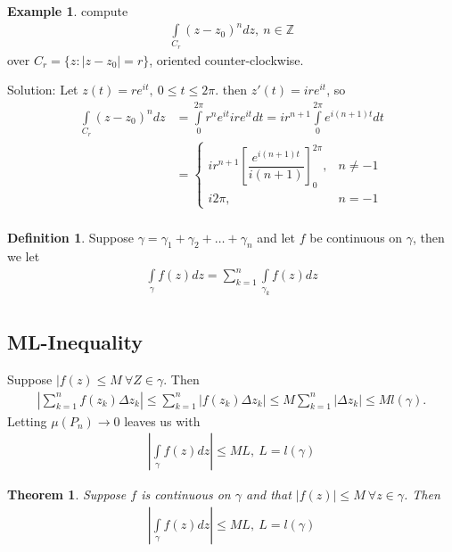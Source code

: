\documentclass[12pt, a4paper]{article}
\theoremstyle{plain}
\newtheorem{thm}{Theorem} %
\theoremstyle{definition}
\newtheorem{definition}{Definition} %
\newtheorem{example}{Example} %
\begin{document}
			\begin{example}
				compute
				\begin{align*}
					\int\limits_{C_r}(z-z_0)^ndz, \:n\in \mathbb{Z}
				\end{align*}
				over $C_r=\{z:|z-z_0|=r\}$, oriented counter-clockwise.

				Solution: Let $z(t)=re^{it},\:0\le t\le 2\pi$. then $z'(t)=ire^{it}$, so
				\begin{align*}
					\int\limits_{C_r}(z-z_0)^ndz &= 
					\int\limits_{0}^{2\pi}r^ne^{it}ire^{it}dt =
					ir^{n+1}\int\limits_{0}^{2\pi}e^{i(n+1)t}dt\\ &=
					\begin{cases}
						ir^{n+1}\left[\dfrac{e^{i(n+1)t}}{i(n+1)}\right]_0^{2\pi}, &n\not=-1\\[0.3cm]
						i2\pi, &n=-1
					\end{cases}\\
				\end{align*}

				\begin{definition}
					Suppose $\gamma=\gamma_1+\gamma_2+\ldots+\gamma_n$ and let $f$ be continuous on $\gamma$, then we let
					\begin{align*}
						\int\limits_{\gamma}f(z)dz = \sum\limits_{k=1}^{n}\int\limits_{\gamma_k}f(z)dz\tag*{and if $\gamma=z_0$ the integral vanishes identically.}\\
					\end{align*}
				\end{definition}
			\end{example}

		\subsection{ML-Inequality} %
		\label{sub:ml_inequality}
			Suppose $|f(z)\le M\:\forall Z\in \gamma$. Then
			\begin{align*}
				\left|\sum\limits_{k=1}^{n}f(z_k)\Delta z_k\right| \le
				\sum\limits_{k=1}^{n}\left|f(z_k)\Delta z_k\right| \le
				M\sum\limits_{k=1}^{n}\left|\Delta z_k\right| \le
				M l(\gamma).
			\end{align*}
			Letting $\mu(P_n)\to 0$ leaves us with
			\begin{align*}
			\left|\int\limits_{\gamma}f(z)dz\right|\le ML,\: L=l(\gamma)
			\end{align*}


		\begin{thm}
			Suppose $f$ is continuous on $\gamma$ and that $|f(z)|\le M\:\forall z\in \gamma$. Then
			\begin{align*}
				\left|\int\limits_{\gamma}f(z)dz\right|\le ML,\: L=l(\gamma)
			\end{align*}
		\end{thm}
\end{document}
